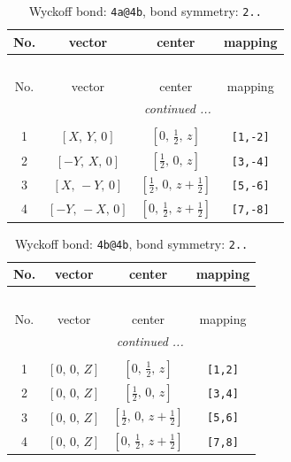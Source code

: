 \documentclass[fleqn,8pt]{jsarticle}
\begin{document}
\begin{longtable}{cccc}
\caption{Wyckoff bond: {\tt 4a@4b}, bond symmetry: {\tt 2..}}
 \\
 \hline \hline
No. & vector & center & mapping \\ \hline \endfirsthead

\multicolumn{3}{l}{\tablename\ \thetable{}} \\
 \hline \hline
No. & vector & center & mapping \\ \hline \endhead

 \hline \hline
\multicolumn{3}{r}{\footnotesize\it continued ...} \\ \endfoot

 \hline \hline
\multicolumn{3}{r}{} \\ \endlastfoot

1 & $\left[ X,\, Y,\, 0 \right]$ & $\left[ 0,\, \frac{1}{2},\, z \right]$ & {\tt [1,-2]} \\ \hline
2 & $\left[ - Y,\, X,\, 0 \right]$ & $\left[ \frac{1}{2},\, 0,\, z \right]$ & {\tt [3,-4]} \\ \hline
3 & $\left[ X,\, - Y,\, 0 \right]$ & $\left[ \frac{1}{2},\, 0,\, z + \frac{1}{2} \right]$ & {\tt [5,-6]} \\ \hline
4 & $\left[ - Y,\, - X,\, 0 \right]$ & $\left[ 0,\, \frac{1}{2},\, z + \frac{1}{2} \right]$ & {\tt [7,-8]} \\
\end{longtable}
\renewcommand{\arraystretch}{1.2}
\begin{longtable}{cccc}
\caption{Wyckoff bond: {\tt 4b@4b}, bond symmetry: {\tt 2..}}
 \\
 \hline \hline
No. & vector & center & mapping \\ \hline \endfirsthead

\multicolumn{3}{l}{\tablename\ \thetable{}} \\
 \hline \hline
No. & vector & center & mapping \\ \hline \endhead

 \hline \hline
\multicolumn{3}{r}{\footnotesize\it continued ...} \\ \endfoot

 \hline \hline
\multicolumn{3}{r}{} \\ \endlastfoot

1 & $\left[ 0,\, 0,\, Z \right]$ & $\left[ 0,\, \frac{1}{2},\, z \right]$ & {\tt [1,2]} \\ \hline
2 & $\left[ 0,\, 0,\, Z \right]$ & $\left[ \frac{1}{2},\, 0,\, z \right]$ & {\tt [3,4]} \\ \hline
3 & $\left[ 0,\, 0,\, Z \right]$ & $\left[ \frac{1}{2},\, 0,\, z + \frac{1}{2} \right]$ & {\tt [5,6]} \\ \hline
4 & $\left[ 0,\, 0,\, Z \right]$ & $\left[ 0,\, \frac{1}{2},\, z + \frac{1}{2} \right]$ & {\tt [7,8]} \\
\end{longtable}
\end{document}
